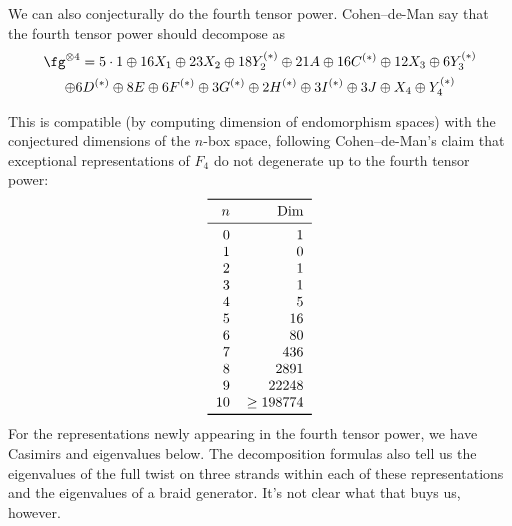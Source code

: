 \documentclass[12pt]{amsart}
\begin{document}
We can also conjecturally do the fourth tensor power. Cohen--de-Man
\cite{MR1381778} say that the fourth tensor power should decompose as
\begin{multline*}
\fg^{\otimes4} = 5\cdot 1 \oplus 16X_1 \oplus 23X_2 \oplus 18Y_2^{(*)}
  \oplus 21A \oplus 16C^{(*)} \oplus 12X_3 \oplus 6Y_3^{(*)} \\
  \oplus 6D^{(*)} \oplus 8E \oplus 6F^{(*)} \oplus 3G^{(*)} \oplus 2H^{(*)}
    \oplus 3I^{(*)} \oplus 3J \oplus X_4 \oplus Y_4^{(*)}
\end{multline*}

This is compatible (by computing dimension of endomorphism spaces)
with the conjectured dimensions of the $n$-box space, following
Cohen--de-Man's claim that exceptional representations of $F_4$ do not
degenerate up to the fourth tensor power:
\[
\begin{tabular}{rr}
  \toprule
  $n$ & Dim\\ \midrule
  0 & 1 \\ 1 & 0 \\ 2 & 1 \\ 3 & 1 \\ 4 & 5 \\ 5 & 16 \\
  6 & 80 \\ 7 & 436 \\ 8 & 2891 \\ 9 & 22248 \\ 10 & $\ge 198774$ \\
  \bottomrule
\end{tabular}
\]
For the representations newly appearing in the fourth tensor power, we
have Casimirs and eigenvalues below. The decomposition formulas also
tell us the eigenvalues of the full twist on three strands within each
of these representations and the eigenvalues of a braid
generator. It's not clear what that buys us, however.
\end{document}
